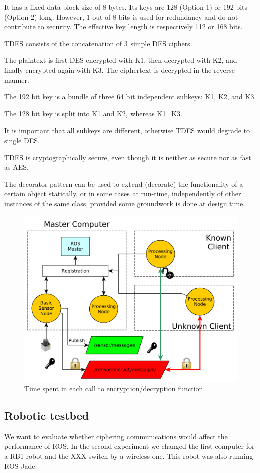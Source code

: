 \documentclass[journal,twoside]{JoPhA}
\begin{document}
It has a fixed data block size of 8 bytes. Its keys are 128 (Option 1) or 192 bits (Option 2) long. However, 1 out of 8 bits is used for redundancy and do not contribute to security. The effective key length is respectively 112 or 168 bits.

TDES consists of the concatenation of 3 simple DES ciphers.

The plaintext is first DES encrypted with K1, then decrypted with K2, and finally encrypted again with K3. The ciphertext is decrypted in the reverse manner.

The 192 bit key is a bundle of three 64 bit independent subkeys: K1, K2, and K3.

The 128 bit key is split into K1 and K2, whereas K1=K3.

It is important that all subkeys are different, otherwise TDES would degrade to single DES.

TDES is cryptographically secure, even though it is neither as secure nor as fast as AES.


The decorator pattern can be used to extend (decorate) the functionality of a certain object statically, or in some cases at run-time, independently of other instances of the same class, provided some groundwork is done at design time. 

\begin{figure}[ht]
    \centering
    \includegraphics[width=.5\textwidth]{TestBed.pdf}
    \caption{Time spent in each call to encryption/decryption function.}
  \label{fig:TestBed}
\end{figure}







\subsection{Robotic testbed}

We want to evaluate whether ciphering communications would affect the performance of ROS. 
In the second experiment we changed the first computer for a RB1 robot and the XXX switch by a wireless one. This robot was also running ROS Jade.
\end{document}
